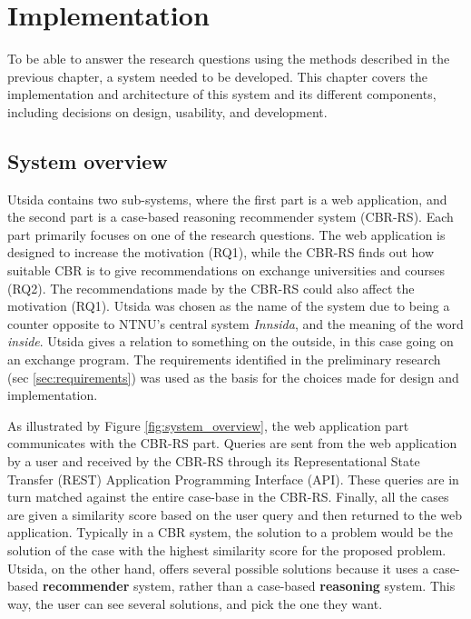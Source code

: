 
\chapter{Implementation}\label{ch5:implementation}

To be able to answer the research questions using the methods described in the previous chapter, a system needed to be developed. This chapter covers the implementation and architecture of this system and its different components, including decisions on design, usability, and development.

\section{System overview}

Utsida contains two sub-systems, where the first part is a web application, and the second part is a case-based reasoning recommender system (CBR-RS). Each part primarily focuses on one of the research questions. The web application is designed to increase the motivation (RQ1), while the CBR-RS finds out how suitable CBR is to give recommendations on exchange universities and courses (RQ2). The recommendations made by the CBR-RS could also affect the motivation (RQ1). Utsida was chosen as the name of the system due to being a counter opposite to NTNU's central system \emph{Innsida}, and the meaning of the word \emph{inside}. Utsida gives a relation to something on the outside, in this case going on an exchange program. The requirements identified in the preliminary research (sec \ref{sec:requirements})  was used as the basis for the choices made for design and implementation.

As illustrated by Figure \ref{fig:system_overview}, the web application part communicates with the CBR-RS part. Queries are sent from the web application by a user and received by the CBR-RS through its Representational State Transfer (REST) Application Programming Interface (API). These queries are in turn matched against the entire case-base in the CBR-RS. Finally, all the cases are given a similarity score based on the user query and then returned to the web application. Typically in a CBR system, the solution to a problem would be the solution of the case with the highest similarity score for the proposed problem. Utsida, on the other hand, offers several possible solutions because it uses a case-based \textbf{recommender} system, rather than a case-based \textbf{reasoning} system. This way, the user can see several solutions, and pick the one they want.  

